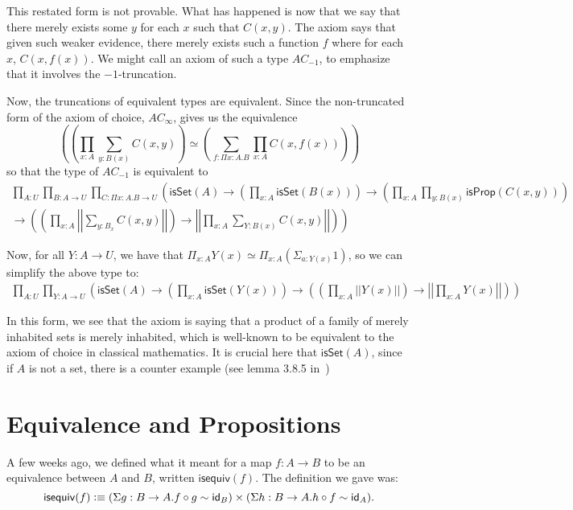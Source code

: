\documentclass[11pt]{article}
\newcommand*{\isSet}{\mathsf{isSet}}
\newcommand*{\isProp}{\mathsf{isProp}}
\newcommand{\iseq}{\mathsf{isequiv}}
\newcommand*{\comp}{\mathbin{\circ}}
\begin{document}
This restated form is not provable. What has happened is now that we say that
there merely exists some $y$ for each $x$ such that $C(x,y)$. The axiom says
that given such weaker evidence, there merely exists such a function $f$ where
for each $x$, $C(x,f(x))$. We might call an axiom of such a type $AC_{-1}$, to
emphasize that it involves the $-1$-truncation.

Now, the truncations of equivalent types are equivalent. Since the
non-truncated form of the axiom of choice, $AC_{\infty}$, gives us the
equivalence
$$
\left(\left( \prod_{x{:}A} \sum_{y: B(x)} C(x,y) \right ) \simeq \left(\sum_{f: \Pi x{:} A. B} \prod_{x:A} C(x, f(x))\right)\right)
$$
so that the type of $AC_{-1}$ is equivalent to
\begin{multline*}
\prod_{A{:}U} \prod_{B{:}A \to U} \prod_{C{:}\Pi x:A. B \to U}
\left(\isSet(A) \to \left(\prod_{x:A} \isSet(B(x))\right) \to \left(\prod_{x:A} \prod_{y: B(x)} \isProp(C(x,y))\right) \right. \\
\left. \to \left(\left( \prod_{x{:}A} \left|\left|\sum_{y: B_x} C(x,y) \right|\right| \right ) \to 
  \left|\left| \prod_{x{:}A} \sum_{Y: B(x)} C(x,y) \right|\right| \right)\right)
\end{multline*}

Now, for all $Y: A \to U$, we have that $\Pi_{x:A} Y(x) \simeq \Pi_{x:A}(\Sigma_{a:Y(x)} 1)$, so we can simplify the above type to:
\begin{multline*}
\prod_{A{:}U} \prod_{Y{:}A \to U}
\left(\isSet(A) \to \left(\prod_{x:A} \isSet(Y(x))\right)
\to \left(\left( \prod_{x{:}A} \left|\left|Y(x) \right|\right| \right) \to 
  \left|\left| \prod_{x{:}A} Y(x) \right|\right| \right)\right)
\end{multline*}

In this form, we see that the axiom is saying that a product of a family of
merely inhabited sets is merely inhabited, which is well-known to be equivalent
to the axiom of choice in classical mathematics. It is crucial here that
$\isSet(A)$, since if $A$ is not a set, there is a counter example (see lemma
3.8.5 in~\cite{HoTTBook2013})


\section{Equivalence and Propositions}

A few weeks ago, we defined what it meant for a map $f: A \to B$ to be an
equivalence between $A$ and $B$, written $\iseq(f)$. The definition we gave
was: $$\iseq(f)\defeq (\Sigma g: B\to A.f\comp g \sim \id_B)\times (\Sigma h:
B\to A.h\comp f \sim \id_A).$$
\end{document}

